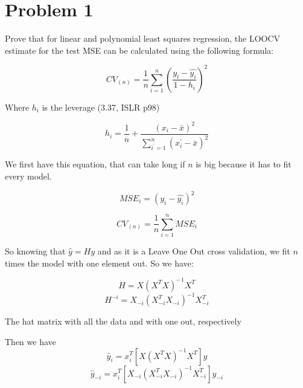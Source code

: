 \section*{Problem 1}


\noindent Prove that for linear and polynomial least squares regression, the LOOCV estimate for the test MSE can be calculated using the following formula: 


\[ CV_{(n)} = \frac{1}{n} \sum_{i = 1}^{n}\left( \frac{y_i - \hat{y_i}}{1 - h_i} \right)^2 \tag{1.1} \label{LOOCV_shortcut}
 \]



\noindent Where $ h_i $ is the leverage (3.37, ISLR p98)


\[ 
h_i = \frac{1}{n} + \frac{(x_i - \bar{x})^2}{\sum_{i^{'} = 1}^{n} (x_i^{'} - \bar{x})^2} \tag{1.2} \label{leverage}
\]

\noindent We first have this equation, that can take long if $n$ is big because it has to fit every model.

\[ MSE_i = (y_i - \hat{y_i})^2 \]

\[ CV_{(n)} = \frac{1}{n} \sum_{i = 1}^{n} MSE_i \]









\noindent So knowing that $ \hat{y} = Hy $ and as it is a Leave One Out cross validation, we fit $ n $ times the model with one element out. So we have:


\[ H = X(X^T X)^{-1} X^T \]
\[ H^{-i} = X_{-i}(X^T_{-i} X_{-i})^{-1} X^T_{-i} \]

\noindent The hat matrix with all the data and with one out, respectively

\noindent Then we have
\[ \hat{y}_i = x_i^T [X(X^T X)^{-1} X^T]y \] 
\[ \hat{y}_{-i} = x_i^T [X_{-i}(X_{-i}^T X_{-i})^{-1} X_{-i}^T]y_{-i} \]

